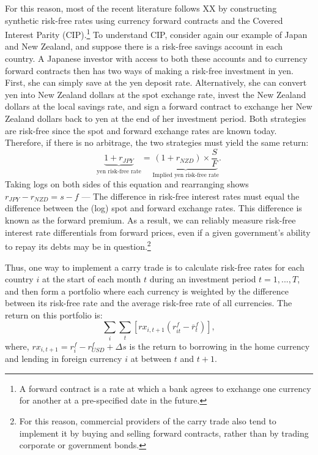 For this reason, most of the recent literature follows XX by
constructing synthetic risk-free rates using currency forward
contracts and the Covered Interest Parity (CIP).\footnote{A forward
  contract is a rate at which a bank agrees to exchange one currency
  for another at a pre-specified date in the future.} To understand
CIP, consider again our example of Japan and New Zealand, and suppose
there is a risk-free savings account in each country. A Japanese
investor with access to both these accounts and to currency forward
contracts then has two ways of making a risk-free investment in yen.
First, she can simply save at the yen deposit rate. Alternatively, she
can convert yen into New Zealand dollars at the spot exchange rate,
invest the New Zealand dollars at the local savings rate, and sign a
forward contract to exchange her New Zealand dollars back to yen at the
end of her investment period. Both strategies are risk-free since the
spot and forward exchange rates are known today. Therefore, if there
is no arbitrage, the two strategies must yield the same return:
\begin{equation}
  \underbrace{1 + r_{JPY}}_{\text{yen risk-free rate}}
  = \underbrace{
    (1 + r_{NZD}) \times \frac{S}{F}
  }_{\text{Implied yen risk-free rate}}.
\end{equation}
Taking logs on both sides of this equation and rearranging shows
$r_{JPY}-r_{NZD}=s-f$ --- The difference in risk-free interest
rates must equal the difference between the (log) spot and forward
exchange rates. This difference is known as the forward premium. As a
result, we can reliably measure risk-free interest rate differentials
from forward prices, even if a given government's ability to repay its
debts may be in question.\footnote{For this reason, commercial providers of the
carry trade also tend to implement it by buying and selling forward
contracts, rather than by trading corporate or government bonds.}

Thus, one way to implement a carry trade is to calculate risk-free 
rates for each country $i$ at the start of each month $t$ during an 
investment period $t = 1, ..., T$, and then form a portfolio where 
each currency is weighted by the difference between its risk-free rate 
and the average risk-free rate of all currencies. The return on this 
portfolio is:
\begin{equation}
  \label{eq_carry}
  \textstyle\sum_{i}\sum_t\left[ rx_{i,t+1}\left( r^f_{it}-\overline{r}^f_{t}\right) \right] ,
\end{equation}%
where, $rx_{i,t+1}=r^f_i-r^f_{USD}+\Delta s$ is the return to 
borrowing in the home currency and lending in foreign currency $i$ at
between $t$ and $t+1$.

